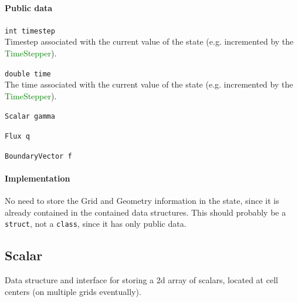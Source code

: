 \documentclass[11pt]{article}
\def\class#1{\textcolor{green}{\ttfamily\small #1}} %
\let\code\lstinline
\begin{document}
\paragraph{Public data}
\begin{description}
	\item \code|int timestep|\\
		Timestep associated with the current value of the state (e.g. incremented by the \class{TimeStepper}).
	\item \code|double time|\\
		The time associated with the current value of the state (e.g. incremented by the \class{TimeStepper}).
	\item \code|Scalar gamma|\\
	\item \code|Flux q|\\
	\item \code|BoundaryVector f|
\end{description}

\paragraph{Implementation}
No need to store the Grid and Geometry information in the state, since it is already contained in the contained data structures.  This should probably be a \code|struct|, not a \code|class|, since it has only public data.

\subsection{Scalar}
Data structure and interface for storing a 2d array of scalars, located at cell centers (on multiple grids eventually).
\end{document}
